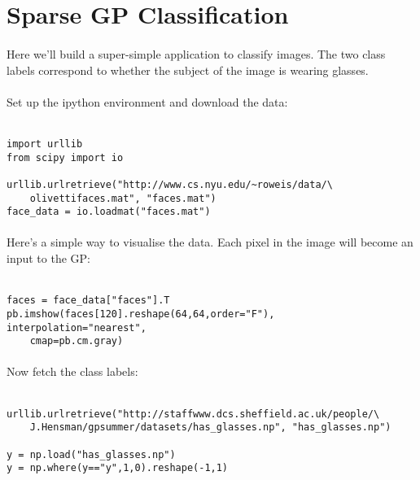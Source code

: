 \documentclass{article}
\begin{document}
\section{Sparse GP Classification}

\paragraph{}
Here we'll build a super-simple application to classify images. The two class
labels correspond to whether the subject of the image is wearing glasses.

\paragraph{}
Set up the ipython environment and download the data:\\ \ \\
\begin{verbatim}
import urllib
from scipy import io

urllib.urlretrieve("http://www.cs.nyu.edu/~roweis/data/\
    olivettifaces.mat", "faces.mat")
face_data = io.loadmat("faces.mat")
\end{verbatim}

\paragraph{}
Here's a simple way to visualise the data. Each pixel in the image will become
an input to the GP:\\ \ \\ 
\begin{verbatim}
faces = face_data["faces"].T
pb.imshow(faces[120].reshape(64,64,order="F"), interpolation="nearest",
    cmap=pb.cm.gray)
\end{verbatim}

\paragraph{}
Now fetch the class labels:\\ \ \\
\begin{verbatim}
urllib.urlretrieve("http://staffwww.dcs.sheffield.ac.uk/people/\
    J.Hensman/gpsummer/datasets/has_glasses.np", "has_glasses.np")

y = np.load("has_glasses.np")
y = np.where(y=="y",1,0).reshape(-1,1)
\end{verbatim}
\end{document}
